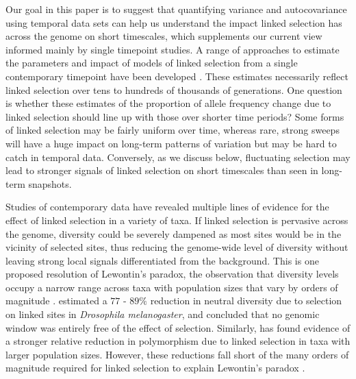 \documentclass[11pt]{article}
\begin{document}
Our goal in this paper is to suggest that quantifying variance and
autocovariance using temporal data sets can help us understand the impact
linked selection has across the genome on short timescales, which supplements
our current view informed mainly by single timepoint studies. A range of
approaches to estimate the parameters and impact of models of linked selection
from a single contemporary timepoint have been developed
\parencite{Wiehe1993-ja,Begun1992-ey,Sella2009-rf,Elyashiv2016-vt,McVicker2009-ax,Hudson1994-yq}.
These estimates necessarily reflect linked selection over tens to hundreds of
thousands of generations. One question is whether these estimates of the
proportion of allele frequency change due to linked selection should line up
with those over shorter time periods? Some forms of linked selection may be
fairly uniform over time, whereas rare, strong sweeps will have a huge impact
on long-term patterns of variation but may be hard to catch in temporal data.
Conversely, as we discuss below, fluctuating selection may lead to stronger
signals of linked selection on short timescales than seen in long-term
snapshots.

Studies of contemporary data have revealed multiple lines of evidence for the
effect of linked selection in a variety of taxa. If linked selection is
pervasive across the genome, diversity could be severely dampened as most sites
would be in the vicinity of selected sites, thus reducing the genome-wide level
of diversity without leaving strong local signals differentiated from the
background. This is one proposed resolution of Lewontin's paradox, the
observation that diversity levels occupy a narrow range across taxa with
population sizes that vary by orders of magnitude
\parencite{Lewontin1974-jb,Maynard_Smith1974-lc,Gillespie2001-ll,Leffler2012-zj}.
\textcite{Elyashiv2016-vt} estimated a $77$ - $89\%$ reduction in neutral
diversity due to selection on linked sites in \emph{Drosophila melanogaster},
and concluded that no genomic window was entirely free of the effect of
selection. Similarly, \textcite{Corbett-Detig2015-gt} has found evidence of a
stronger relative reduction in polymorphism due to linked selection in taxa
with larger population sizes. However, these reductions fall short of the many
orders of magnitude required for linked selection to explain Lewontin's paradox
\parencite{Coop2016-gx}.   
\end{document}
